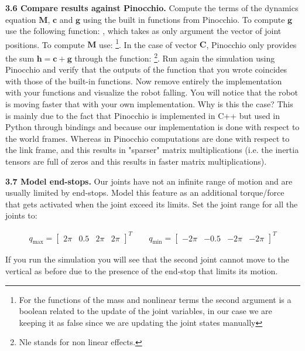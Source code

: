 \documentclass[11pt]{article}
\newcommand{\mat}[1]{\ensuremath{\begin{bmatrix}#1\end{bmatrix}}}	%
\begin{document}
\textbf{3.6 Compare results against Pinocchio.} Compute the terms of the dynamics equation $\mathbf{M}$, $\mathbf{c}$ and $\mathbf{g}$ using the built in functions from Pinocchio. To compute $\mathbf{g}$ use the following function: , which takes as only argument the vector of joint positions. To compute $\mathbf{M}$ use: \footnote{For the functions of the mass and nonlinear terms the second argument is a boolean related to the update of the joint variables, in our case we are keeping it as false since we are updating the joint states manually}. In the case of vector $\mathbf{C}$, Pinocchio only provides the sum $\mathbf{h} = \mathbf{c} +  \mathbf{g}$ through the function: \footnote{Nle stands for non linear effects.}. Run again the simulation using Pinocchio and verify that the outputs of the function that you wrote coincides with those of the built-in functions. Now remove entirely the implementation with your functions and visualize the robot falling. You will notice that the robot is moving  faster that with your own implementation. Why is this the case?  This is mainly due to the fact that Pinocchio is implemented in C++ but used in Python through bindings and because our implementation is done with respect to the world frames. Whereas in Pinocchio computations are done  with respect to the link frame, and this results in "sparser" matrix multiplications (i.e. the inertia tensors are full of zeros and this results in faster matrix multiplications).

\textbf{3.7 Model end-stops.} Our joints have not an infinite range of motion and are usually limited by end-stops. Model this feature as an additional torque/force that gets activated when the 
joint exceed its limits. Set the joint range for all the joints to:

\begin{align*}
q_{\text{max}} = \mat{2\pi &   0.5 &  2\pi & 2\pi}^T \quad \quad
q_{\text{min}} = \mat{-2\pi &   -0.5 &  -2\pi & -2\pi}^T
\end{align*}

If you run the simulation you will see that the second joint cannot move to the vertical as before due to the presence of the end-stop that limits its motion.
\end{document}
